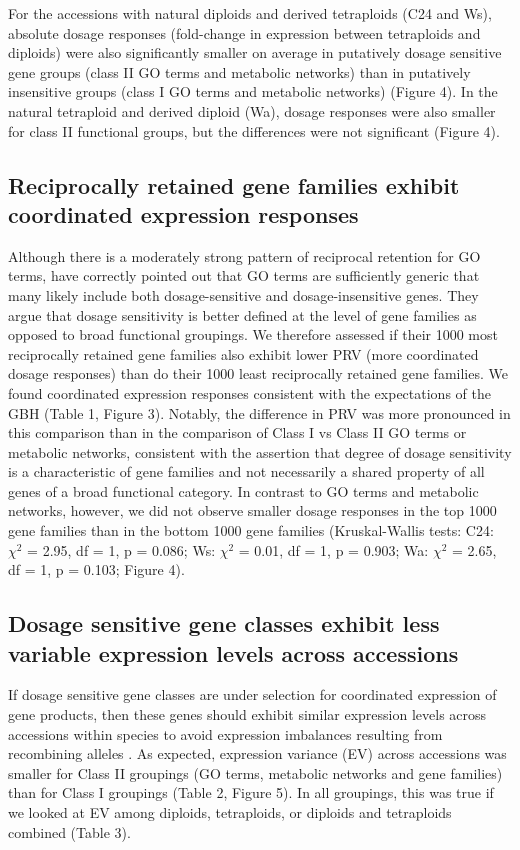 \documentclass[11pt]{article}
\begin{document}
For the accessions with natural diploids and derived tetraploids (C24 and Ws), absolute dosage responses (fold-change in expression between tetraploids and diploids) were also significantly smaller on average in putatively dosage sensitive gene groups (class II GO terms and metabolic networks) than in putatively insensitive groups (class I GO terms and metabolic networks) (Figure 4). In the natural tetraploid and derived diploid (Wa), dosage responses were also smaller for class II functional groups, but the differences were not significant (Figure 4).

\subsection*{Reciprocally retained gene families exhibit coordinated expression responses}

Although there is a moderately strong pattern of reciprocal retention for GO terms, \cite{tasdighian2017} have correctly pointed out that GO terms are sufficiently generic that many likely include both dosage-sensitive and dosage-insensitive genes. They argue that dosage sensitivity is better defined at the level of gene families as opposed to broad functional groupings. We therefore assessed if their 1000 most reciprocally retained gene families also exhibit lower PRV (more coordinated dosage responses) than do their 1000 least reciprocally retained gene families. We found coordinated expression responses consistent with the expectations of the GBH (Table 1, Figure 3). Notably, the difference in PRV was more pronounced in this comparison than in the comparison of Class I vs Class II GO terms or metabolic networks, consistent with the \cite{tasdighian2017} assertion that degree of dosage sensitivity is a characteristic of gene families and not necessarily a shared property of all genes of a broad functional category. 
	In contrast to GO terms and metabolic networks, however, we did not observe smaller dosage responses in the top 1000 gene families than in the bottom 1000 gene families (Kruskal-Wallis tests: C24: $\chi^2$ = 2.95,  df = 1, p = 0.086; Ws: $\chi^2$ = 0.01,  df = 1, p = 0.903; Wa: $\chi^2$ = 2.65,  df = 1, p = 0.103; Figure 4). 

\subsection*{Dosage sensitive gene classes exhibit less variable expression levels across accessions}

If dosage sensitive gene classes are under selection for coordinated expression of gene products, then these genes should exhibit similar expression levels across accessions within species to avoid expression imbalances resulting from recombining alleles \citep{coate2016}. As expected, expression variance (EV) across accessions was smaller for Class II groupings (GO terms, metabolic networks and gene families) than for Class I groupings (Table 2, Figure 5). In all groupings, this was true if we looked at EV among diploids, tetraploids, or diploids and tetraploids combined (Table 3).
\end{document}

